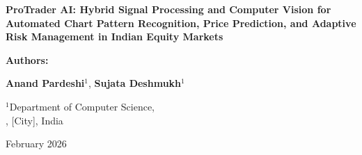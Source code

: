 \documentclass[12pt,a4paper]{article}
\begin{document}
\begin{titlepage}
    \centering
    \vspace*{1cm}
    {\Huge\bfseries ProTrader AI: Hybrid Signal Processing and Computer Vision for Automated Chart Pattern Recognition, Price Prediction, and Adaptive Risk Management in Indian Equity Markets\par}
    \vspace{2cm}
    
    {\Large\bfseries Authors:\par}
    \vspace{0.5cm}
    {\large
    \textbf{Anand Pardeshi}$^{1}$, \textbf{Sujata Deshmukh}$^{1}$\par}
    \vspace{0.8cm}
    
    {\normalsize
    $^{1}$Department of Computer Science,\\
    [College Name], [City], India\par}
    \vspace{1.5cm}
    
    {\large February 2026\par}
    \vspace{1.5cm}
    

\end{titlepage}
\end{document}
